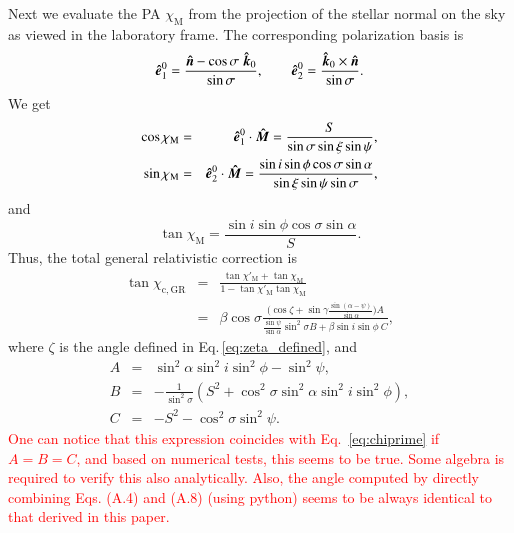 \documentclass{aa}
\newcommand{\be}{\begin{equation}}
\newcommand{\ee}{\end{equation}}
\newcommand{\beq}{\begin{eqnarray}}
\newcommand{\eeq}{\end{eqnarray}}
\newcommand{\unit}[1]{\mbox{\boldmath $\hat{#1}$}}
\newcommand{\red}[1]{\textcolor{red}{#1}}
\begin{document}
Next we evaluate the PA $\chi_{\mathrm{M}}$ from the projection of the stellar normal on the sky as viewed in the laboratory frame.
The corresponding polarization basis is
\be\label{eq:pout51}
\unit{e}_1^{0} = \frac{\unit{n}-\cos{\sigma}\  \unit{k}_0}{\sin{\sigma}},\qquad 
\unit{e}_2^{0} = \frac{\unit{k}_0 \times \unit{n}}{\sin{\sigma}} .
\ee
We get 
\beq\label{eq:pout52}
\cos{\chi_{\mathrm{M}}}& = & \unit{e}_1^{0} \cdot \unit{M} = 
\frac{S}{\sin \sigma \sin \xi \sin \psi} ,  \\
\label{eq:pout53}
\sin{\chi_{\mathrm{M}}} & = &  \unit{e}_2^{0} \cdot \unit{M} =  
\frac{\sin i \sin \phi \cos \sigma \sin \alpha}{\sin \xi \sin \psi \sin \sigma} ,
\eeq
and 
\be\label{eq:pout54}
\tan{\chi_{\mathrm{M}}} = \frac{\sin i \sin \phi \cos \sigma \sin \alpha}{S} .
\ee
Thus, the total general relativistic correction is
\beq\label{eq:pout55}
\tan\chi_{\mathrm{c,GR}} & = & \frac{\tan{\chi'_{\mathrm{M}}}+\tan{\chi_{\mathrm{M}}}}{1-\tan{\chi'_{\mathrm{M}}}\tan{\chi_{\mathrm{M}}}} \nonumber \\
&=& \beta \cos \sigma \frac{\Big(\cos\zeta + \sin \gamma \frac{\sin (\alpha-\psi)}{\sin \alpha} \Big) A}{\frac{\sin \psi}{\sin \alpha}\sin^{2}\sigma B + \beta \sin i \sin \phi\ C},
\eeq
where $\zeta$ is the angle defined in Eq.\,\eqref{eq:zeta_defined}, and
\beq 
A & = &  \sin^{2}\alpha\sin^{2}i\sin^{2}\phi - \sin^{2}\psi, \\
B & = & -\frac{1}{\sin^{2}\sigma} (S^{2} + \cos^{2}\sigma \sin^{2}\alpha \sin^{2} i \sin^{2} \phi ), \\
C & = & -S^{2}-\cos^{2}\sigma\sin^{2}\psi. 
\eeq 
\red{One can notice that this expression coincides with Eq.\, \eqref{eq:chiprime} if $A=B=C$, and based on numerical tests, this seems to be true. 
Some algebra is required to verify this also analytically.
Also, the angle computed by directly combining Eqs. (A.4) and (A.8) (using python) seems to be always identical to that derived in this paper.
}
\end{document}
